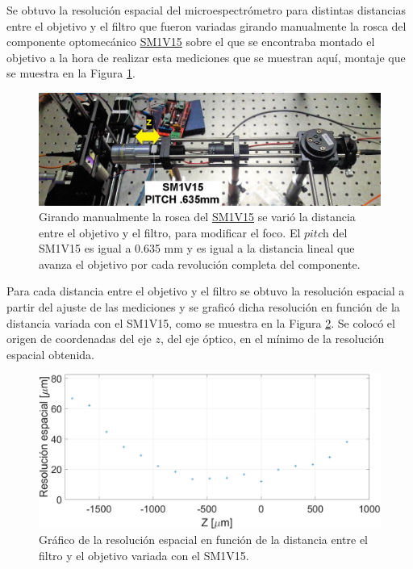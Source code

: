 Se obtuvo la resolución espacial del microespectrómetro para distintas distancias entre el objetivo y el filtro que fueron variadas girando manualmente la rosca del componente optomecánico \href{https://www.thorlabs.com/thorproduct.cfm?partnumber=SM1V15}{SM1V15} sobre el que se encontraba montado el objetivo a la hora de realizar esta mediciones que se muestran aquí, montaje que se muestra en la Figura \ref{fig:montajecirc}. 
\begin{figure}[H]
	\centering
	\includegraphics[width=1.0\textwidth]{Figs/microespectrometro/ajustefocoz.jpg}
	\caption{Girando manualmente la rosca del \href{https://www.thorlabs.com/thorproduct.cfm?partnumber=SM1V15}{SM1V15} se varió la distancia entre el objetivo y el filtro, para modificar el foco. El $\textit{pitch}$ del SM1V15 es igual a 0.635 mm y es igual a la distancia lineal que avanza el objetivo por cada revolución completa del componente.}
	\label{fig:montajecirc}
\end{figure}

Para cada distancia entre el objetivo y el filtro se obtuvo la resolución espacial a partir del ajuste de las mediciones y se graficó dicha resolución en función de la distancia variada con el SM1V15, como se muestra en la Figura \ref{fig:resolespz}. Se colocó el origen de coordenadas del eje $\textit{z}$, del eje óptico, en el mínimo de la resolución espacial obtenida. 

\begin{figure}[H]
	\centering
	\includegraphics[width=1.0\textwidth]{Figs/microespectrometro/focoz.png}
	\caption{Gráfico de la resolución espacial en función de la distancia entre el filtro y el objetivo variada con el SM1V15.}
	\label{fig:resolespz}
\end{figure}

